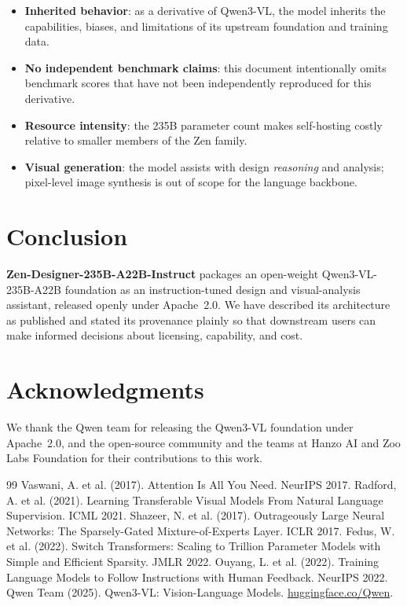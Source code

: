 \documentclass[11pt,a4paper]{article}
\begin{document}
\begin{itemize}
    \item \textbf{Inherited behavior}: as a derivative of Qwen3-VL, the model inherits the
          capabilities, biases, and limitations of its upstream foundation and training data.
    \item \textbf{No independent benchmark claims}: this document intentionally omits
          benchmark scores that have not been independently reproduced for this derivative.
    \item \textbf{Resource intensity}: the 235B parameter count makes self-hosting costly
          relative to smaller members of the Zen family.
    \item \textbf{Visual generation}: the model assists with design \emph{reasoning} and
          analysis; pixel-level image synthesis is out of scope for the language backbone.
\end{itemize}

\section{Conclusion}

\textbf{Zen-Designer-235B-A22B-Instruct} packages an open-weight Qwen3-VL-235B-A22B foundation
as an instruction-tuned design and visual-analysis assistant, released openly under Apache~2.0.
We have described its architecture as published and stated its provenance plainly so that
downstream users can make informed decisions about licensing, capability, and cost.

\section*{Acknowledgments}

We thank the Qwen team for releasing the Qwen3-VL foundation under Apache~2.0, and the
open-source community and the teams at Hanzo AI and Zoo Labs Foundation for their
contributions to this work.

\begin{thebibliography}{99}
 Vaswani, A. et al. (2017). Attention Is All You Need. NeurIPS 2017.
 Radford, A. et al. (2021). Learning Transferable Visual Models From Natural Language Supervision. ICML 2021.
 Shazeer, N. et al. (2017). Outrageously Large Neural Networks: The Sparsely-Gated Mixture-of-Experts Layer. ICLR 2017.
 Fedus, W. et al. (2022). Switch Transformers: Scaling to Trillion Parameter Models with Simple and Efficient Sparsity. JMLR 2022.
 Ouyang, L. et al. (2022). Training Language Models to Follow Instructions with Human Feedback. NeurIPS 2022.
 Qwen Team (2025). Qwen3-VL: Vision-Language Models. \href{https://huggingface.co/Qwen}{huggingface.co/Qwen}.
\end{thebibliography}
\end{document}
